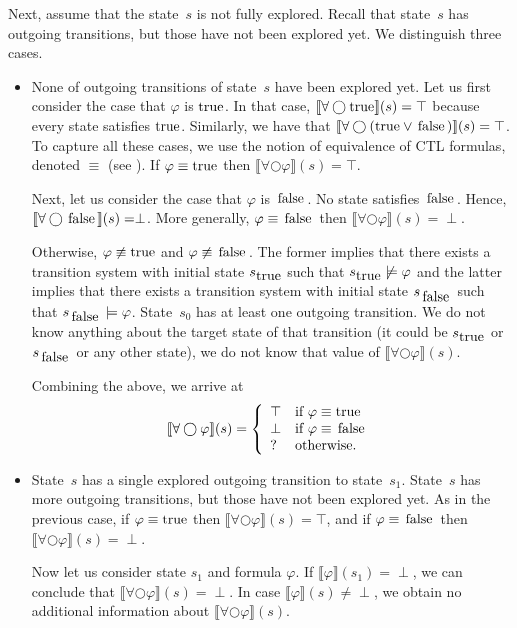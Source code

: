 \documentclass[12pt]{article}
\newcommand{\nxt}{\bigcirc}
\newcommand{\TRUE}{\mbox{\lstinline{true}}}
\newcommand{\FALSE}{\mbox{\lstinline{false}}}
\theoremstyle{definition}
\newcommand{\satisfaction}[1]{\llbracket #1 \rrbracket}
\begin{document}
Next, assume that the state~$s$ is not fully explored.  Recall that state~$s$ has outgoing transitions, but those have not been explored yet.  We distinguish three cases.
\begin{itemize}
\item 
None of outgoing transitions of state~$s$ have been explored yet.  Let us first consider the case that $\varphi$ is $\TRUE$.  In that case, $\satisfaction{\forall \nxt \TRUE}(s) = \top$ because every state satisfies $\TRUE$.  Similarly, we have that $\satisfaction{\forall \nxt (\TRUE \vee \FALSE)}(s) = \top$.  To capture all these cases, we use the notion of equivalence of CTL formulas, denoted $\equiv$ (see \cite[Definition~6.12]{BK08}).  If $\varphi \equiv \TRUE$ then $\satisfaction{\forall \nxt \varphi}(s) = \top$.

Next, let us consider the case that $\varphi$ is $\FALSE$.  No state satisfies $\FALSE$.  Hence, $\satisfaction{\forall \nxt \FALSE}(s) = \perp$.  More generally, $\varphi \equiv \FALSE$ then $\satisfaction{\forall \nxt \varphi}(s) = \perp$.

Otherwise, $\varphi \not\equiv \TRUE$ and $\varphi \not\equiv \FALSE$.  The former implies that there exists a transition system with initial state $s_{\TRUE}$ such that $s_{\TRUE} \not\models \varphi$ and the latter implies that there exists a transition system with initial state $s_{\FALSE}$ such that $s_{\FALSE} \models \varphi$.  State~$s_0$ has at least one outgoing transition.  We do not know anything about the target state of that transition (it could be $s_{\TRUE}$ or $s_{\FALSE}$ or any other state), we do not know that value of $\satisfaction{\forall \nxt \varphi}(s)$.

Combining the above, we arrive at
\[
\satisfaction{\forall \nxt \varphi}(s) = \left \{
\begin{array}{ll}
\top & \mbox{if $\varphi \equiv \TRUE$}\\
\perp & \mbox{if $\varphi \equiv \FALSE$}\\
? & \mbox{otherwise.}
\end{array}
\right .
\]
\item
State~$s$ has a single explored outgoing transition to state~$s_1$.  State~$s$ has more outgoing transitions, but those have not been explored yet.   As in the previous case, if  $\varphi \equiv \TRUE$ then $\satisfaction{\forall \nxt \varphi}(s) = \top$, and if $\varphi \equiv \FALSE$ then $\satisfaction{\forall \nxt \varphi}(s) = \perp$.

Now let us consider state $s_1$ and formula $\varphi$.  If $\satisfaction{\varphi}(s_1) = \perp$, we can conclude that $\satisfaction{\forall \nxt \varphi}(s) = \perp$.  In case $\satisfaction{\varphi}(s) \not= \perp$, we obtain no additional information about $\satisfaction{\forall \nxt \varphi}(s)$.


\end{itemize}
\end{document}
